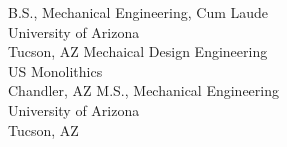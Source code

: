  {B.S., Mechanical Engineering, Cum Laude\\ University of Arizona\\ Tucson, AZ}
 {Mechaical Design Engineering \\ US Monolithics \\ Chandler, AZ}
 {M.S., Mechanical Engineering \\ University of Arizona \\ Tucson, AZ}





